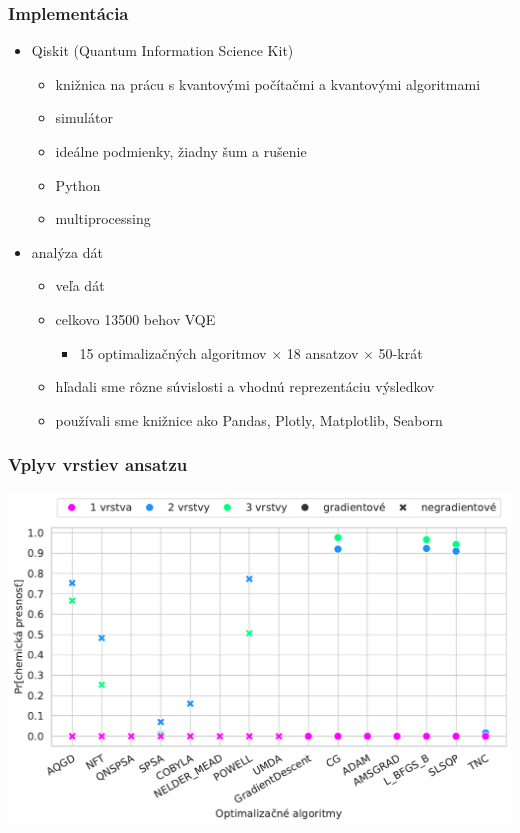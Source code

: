 \documentclass{beamer}
\begin{document}
\begin{frame}
    \frametitle{Implementácia}
    \begin{itemize}
        \item Qiskit (Quantum Information Science Kit)
        \begin{itemize}
        \item knižnica na prácu s kvantovými počítačmi a kvantovými algoritmami
        \item simulátor
        \item ideálne podmienky, žiadny šum a rušenie 
        \item Python
        \item multiprocessing
        \end{itemize}
    \end{itemize}
    \begin{itemize}
        \item analýza dát
        \begin{itemize}
            \item veľa dát
            \item celkovo 13500 behov VQE
            \begin{itemize}
                \item 15 optimalizačných algoritmov $\times$ 18 ansatzov $\times$ 50-krát
            \end{itemize}
            \item hľadali sme rôzne súvislosti a vhodnú reprezentáciu výsledkov
            \item používali sme knižnice ako Pandas, Plotly, Matplotlib, Seaborn 
        \end{itemize}
    \end{itemize}
\end{frame}

\begin{frame}
    \frametitle{Vplyv vrstiev ansatzu} 
	\includegraphics[width=1\textwidth]{layers-sk.pdf}
\end{frame}
\end{document}
